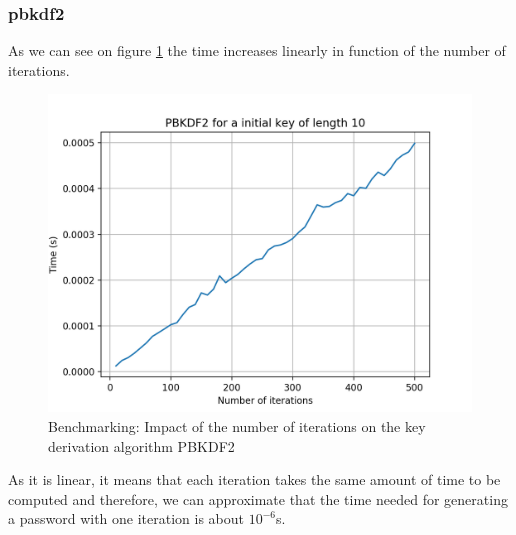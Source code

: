 \documentclass{eplmastersthesis}
\begin{document}
\subsubsection{\gls{pbkdf2}}
As we can see on figure \ref{benchmarking:timePBKDF2} the time increases linearly in function of the number of iterations.
\begin{figure}[h!]
\begin{center}
	\includegraphics[scale=0.6]{res/TimePBKDF2}
	\caption{Benchmarking: Impact of the number of iterations on the key derivation algorithm PBKDF2}
	\label{benchmarking:timePBKDF2}
\end{center}
\end{figure}
As it is linear, it means that each iteration takes the same amount of time to be computed and therefore, we can approximate that the time needed for generating a password with one iteration is about $10^{-6}$s.
\end{document}
